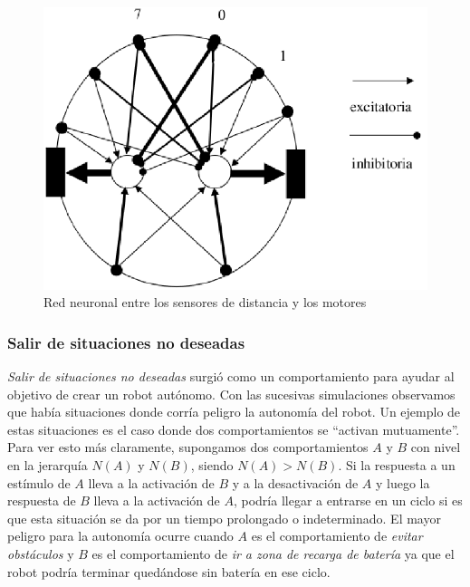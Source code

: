 \begin{figure}[htp]
\begin{center}
\includegraphics[scale=0.4]{comportamientos/red.png}
\caption{Red neuronal entre los sensores de distancia y los motores}
\label{fig:redN}
\end{center}
\end{figure}

\subsubsection{Salir de situaciones no deseadas}
\label{out_of_unwanted_situations}
\emph{Salir de situaciones no deseadas} surgi\'o como un comportamiento
para ayudar al objetivo de crear un robot aut\'onomo. Con las sucesivas
simulaciones observamos que hab\'ia situaciones donde corr\'ia
peligro la autonom\'ia del robot. Un ejemplo de estas situaciones es el caso
donde dos comportamientos se ``activan mutuamente''.
\\
Para ver esto m\'as claramente, supongamos dos comportamientos $A$ y $B$ con
nivel en la jerarqu\'ia $N(A)$ y $N(B)$, siendo $N(A) > N(B)$. Si la respuesta
a un est\'imulo de $A$ lleva a la activaci\'on de $B$ y a la desactivaci\'on de
$A$ y luego la respuesta de $B$ lleva a la activaci\'on de $A$, podr\'ia llegar
a entrarse en un ciclo si es que esta situaci\'on se da por un tiempo
prolongado o indeterminado. El mayor peligro para la autonom\'ia ocurre
cuando $A$ es el comportamiento de \emph{evitar obst\'aculos} y $B$ es el
comportamiento de \emph{ir a zona de recarga de bater\'ia} ya que el robot
podr\'ia terminar qued\'andose sin bater\'ia en ese ciclo.

